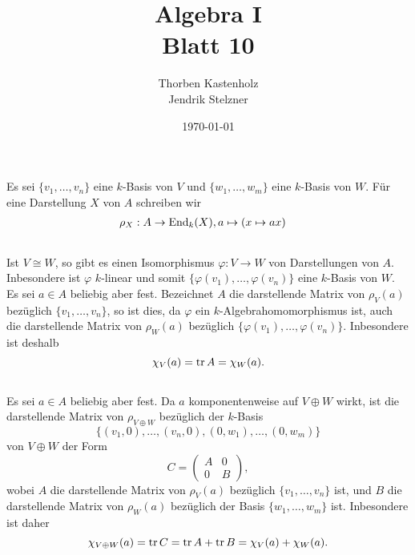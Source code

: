 \documentclass[a4paper,10pt]{article}
\title{\sc Algebra I \\ \Large Blatt 10}
\author{Thorben Kastenholz \\ Jendrik Stelzner}
\date{\today}
\begin{document}
\maketitle






\section{}
Es sei $\{v_1, \ldots, v_n\}$ eine $k$-Basis von $V$ und $\{w_1, \ldots, w_m\}$ eine $k$-Basis von $W$. Für eine Darstellung $X$ von $A$ schreiben wir
\begin{align*}
 &\rho_X : A \to \operatorname{End}_k(X), a \mapsto (x \mapsto ax)
\end{align*}



\subsection{}
Ist $V \cong W$, so gibt es einen Isomorphismus $\varphi : V \to W$ von Darstellungen von $A$. Inbesondere ist $\varphi$ $k$-linear und somit $\{\varphi(v_1), \ldots, \varphi(v_n)\}$ eine $k$-Basis von $W$. Es sei $a \in A$ beliebig aber fest. Bezeichnet $A$ die darstellende Matrix von $\rho_V(a)$ bezüglich $\{v_1, \ldots, v_n\}$, so ist dies, da $\varphi$ ein $k$-Algebrahomomorphismus ist, auch die darstellende Matrix von $\rho_W(a)$ bezüglich $\{\varphi(v_1), \ldots, \varphi(v_n)\}$. Inbesondere ist deshalb
\[
 \chi_V(a) = \operatorname{tr} A = \chi_W(a).
\]



\subsection{}
Es sei $a \in A$ beliebig aber fest. Da $a$ komponentenweise auf $V \oplus W$ wirkt, ist die darstellende Matrix von $\rho_{V \oplus W}$ bezüglich der $k$-Basis
\[
 \{(v_1, 0), \ldots, (v_n, 0), (0, w_1), \ldots, (0, w_m)\}
\]
von $V \oplus W$ der Form
\[
 C =
 \begin{pmatrix}
  A & 0 \\
  0 & B
 \end{pmatrix},
\]
wobei $A$ die darstellende Matrix von $\rho_V(a)$ bezüglich $\{v_1, \ldots, v_n\}$ ist, und $B$ die darstellende Matrix von $\rho_W(a)$ bezüglich der Basis $\{w_1, \ldots, w_m\}$ ist. Inbesondere ist daher
\[
 \chi_{V \oplus W}(a) = \operatorname{tr} C = \operatorname{tr} A + \operatorname{tr} B = \chi_V(a) + \chi_W(a).
\]
\end{document}
